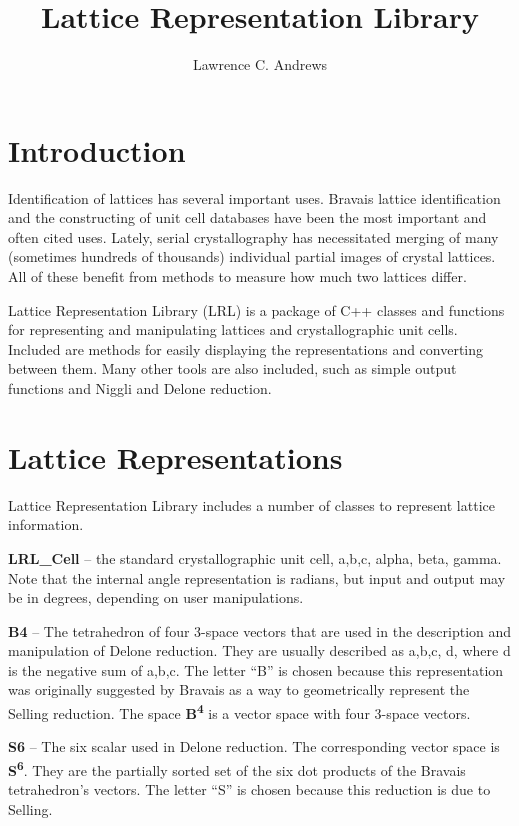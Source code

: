 \documentclass[11pt]{article} %
\title{Lattice Representation Library}
\author{Lawrence C. Andrews}
\begin{document}
\maketitle
\tableofcontents

\section{Introduction}

Identification of lattices has several important uses. Bravais lattice identification and the constructing of unit cell databases have been the most important and often cited uses. Lately, serial crystallography has necessitated merging of many (sometimes hundreds of thousands) individual partial images of crystal lattices. All of these benefit from methods to measure how much two lattices differ.

Lattice Representation Library (LRL) is a package of C++ classes and functions for representing and manipulating lattices and crystallographic unit cells. Included are methods for easily displaying the representations and converting between them. Many other tools are also included, such as simple output functions and Niggli and Delone reduction.

\section{Lattice Representations}

Lattice Representation Library includes a number of classes to represent lattice information.

\textbf{LRL\_Cell} – the standard crystallographic unit cell, a,b,c, alpha, beta, gamma. Note that the internal angle representation is radians, but input and output may be in degrees, depending on user manipulations.

\textbf{B4} – The tetrahedron of four 3-space vectors that are used in the description and manipulation of Delone reduction. They are usually described as a,b,c, d, where d is the negative sum of a,b,c. The letter “B” is chosen because this representation was originally suggested by Bravais as a way to geometrically represent the Selling reduction. The space \textbf{B\textsuperscript{4}} is a vector space with four 3-space vectors.

\textbf{S6} – The six scalar used in Delone reduction. The corresponding vector space is \textbf{S\textsuperscript{6}}. They are the partially sorted set of the six dot products of the Bravais tetrahedron’s vectors. The letter “S” is chosen because this reduction is due to Selling.
\end{document}
